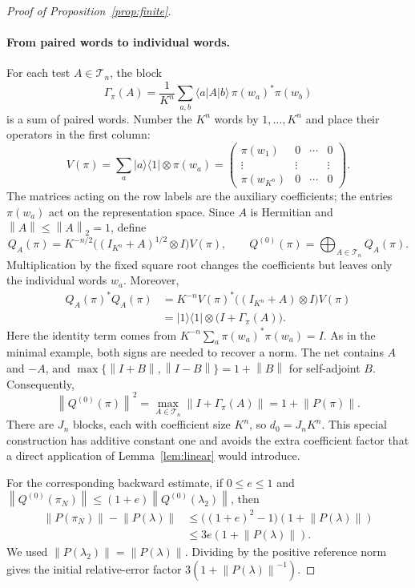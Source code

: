\documentclass[11pt]{article}
\numberwithin{equation}{section}
\theoremstyle{boldremark}\newtheorem{remark}[theorem]{Remark}
\newcommand{\norm}[1]{\left\lVert #1\right\rVert}
\newcommand{\ket}[1]{\lvert #1\rangle}
\newcommand{\bra}[1]{\langle #1\rvert}
\begin{document}
\begin{proof}[Proof of Proposition~\ref{prop:finite}]
\paragraph{From paired words to individual words.}
For each test $A\in\mathcal T_n$, the block
\[
 \Gamma_\pi(A)=\frac1{K^n}\sum_{a,b}\bra a A\ket b\,
                             \pi(w_a)^*\pi(w_b)
\]
is a sum of paired words. Number the $K^n$ words by $1,\ldots,K^n$
and place their operators in the first column:
\[
 V(\pi)=\sum_a\ket a\bra1\otimes\pi(w_a)
 =\begin{pmatrix}
 \pi(w_1)&0&\cdots&0\\
 \vdots&\vdots&&\vdots\\
 \pi(w_{K^n})&0&\cdots&0
 \end{pmatrix}.
\]
The matrices acting on the row labels are the auxiliary coefficients;
the entries $\pi(w_a)$ act on the representation space.
Since $A$ is Hermitian and $\norm A\le\norm A_2=1$, define
\[
 Q_A(\pi)=K^{-n/2}\bigl((I_{K^n}+A)^{1/2}\otimes I\bigr)V(\pi),
 \qquad Q^{(0)}(\pi)=\bigoplus_{A\in\mathcal T_n}Q_A(\pi).
\]
Multiplication by the fixed square root changes the coefficients
but leaves only the individual words $w_a$. Moreover,
\[
 \begin{aligned}
 Q_A(\pi)^*Q_A(\pi)
 &=K^{-n}V(\pi)^*\bigl((I_{K^n}+A)\otimes I\bigr)V(\pi)\\
 &=\ket1\bra1\otimes\bigl(I+\Gamma_\pi(A)\bigr).
 \end{aligned}
\]
Here the identity term comes from
$K^{-n}\sum_a\pi(w_a)^*\pi(w_a)=I$.
As in the minimal example, both signs are needed to recover a norm.
The net contains $A$ and $-A$, and
$\max\{\norm{I+B},\norm{I-B}\}=1+\norm B$ for self-adjoint $B$.
Consequently,
\begin{equation}
 \norm{Q^{(0)}(\pi)}^2
 =\max_{A\in\mathcal T_n}\norm{I+\Gamma_\pi(A)}
 =1+\norm{P(\pi)}.
 \label{eq:gram-reduction}
\end{equation}
There are $J_n$ blocks, each with coefficient size $K^n$, so
$d_0=J_nK^n$. This special construction has additive constant one
and avoids the extra coefficient factor that a direct application of
Lemma~\ref{lem:linear} would introduce.

For the corresponding backward estimate, if $0\le e\le1$ and
$\norm{Q^{(0)}(\pi_N)}\le(1+e)\norm{Q^{(0)}(\lambda_2)}$, then
\[
 \begin{aligned}
 \norm{P(\pi_N)}-\norm{P(\lambda)}
 &\le\bigl((1+e)^2-1\bigr)(1+\norm{P(\lambda)})\\
 &\le3e(1+\norm{P(\lambda)}).
 \end{aligned}
\]
We used $\norm{P(\lambda_2)}=\norm{P(\lambda)}$.
Dividing by the positive reference norm gives the initial
relative-error factor $3(1+\norm{P(\lambda)}^{-1})$.


\end{proof}
\end{document}
